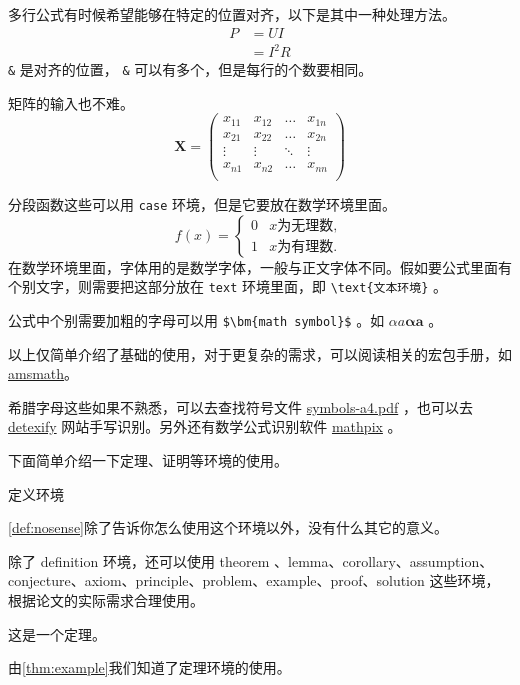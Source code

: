 \documentclass[withoutpreface,bwprint]{cumcmthesis}
\begin{document}
多行公式有时候希望能够在特定的位置对齐，以下是其中一种处理方法。
\begin{align}
P & = UI \\
& = I^2R
\end{align}
\verb|&| 是对齐的位置， \verb|&| 可以有多个，但是每行的个数要相同。

矩阵的输入也不难。
\[
\mathbf{X} = \left(
    \begin{array}{cccc}
    x_{11} & x_{12} & \ldots & x_{1n}\\
    x_{21} & x_{22} & \ldots & x_{2n}\\
    \vdots & \vdots & \ddots & \vdots\\
    x_{n1} & x_{n2} & \ldots & x_{nn}\\
    \end{array} \right)
\]

分段函数这些可以用 \verb|case| 环境，但是它要放在数学环境里面。
\[
f(x) =
    \begin{cases}
        0 &  x \text{为无理数} ,\\
        1 &  x \text{为有理数} .
    \end{cases}
\]
在数学环境里面，字体用的是数学字体，一般与正文字体不同。假如要公式里面有个别文字，则需要把这部分放在 \verb|text| 环境里面，即 \verb|\text{文本环境}| 。

公式中个别需要加粗的字母可以用 \verb|$\bm{math symbol}$| 。如 $ \alpha a\bm{\alpha a} $ 。

以上仅简单介绍了基础的使用，对于更复杂的需求，可以阅读相关的宏包手册，如 \href{http://texdoc.net/texmf-dist/doc/latex/amsmath/amsldoc.pdf}{amsmath}。

希腊字母这些如果不熟悉，可以去查找符号文件 \href{http://mirrors.ctan.org/info/symbols/comprehensive/symbols-a4.pdf}{symbols-a4.pdf} ，也可以去 \href{http://detexify.kirelabs.org/classify.html}{detexify} 网站手写识别。另外还有数学公式识别软件 \href{https://mathpix.com/}{mathpix} 。

下面简单介绍一下定理、证明等环境的使用。
\begin{definition}
    定义环境
    \label{def:nosense}
\end{definition}
\cref{def:nosense}除了告诉你怎么使用这个环境以外，没有什么其它的意义。

除了 definition 环境，还可以使用 theorem 、lemma、corollary、assumption、conjecture、axiom、principle、problem、example、proof、solution 这些环境，根据论文的实际需求合理使用。

\begin{theorem}
    这是一个定理。
    \label{thm:example}
\end{theorem}
由\cref{thm:example}我们知道了定理环境的使用。
\end{document}

